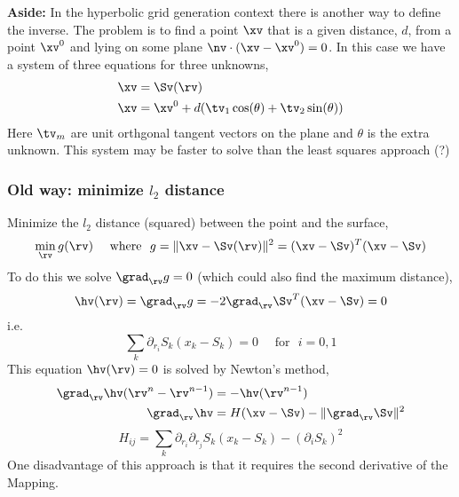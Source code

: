 {\bf Aside:} In the hyperbolic grid generation context there is another way to define
the inverse. The problem is to find a point $\xv$ that is a given distance, $d$,
from a point $\xv^0$ and lying on some plane $\nv\cdot(\xv-\xv^0)=0$. In this case
we have a system of three equations for three unknowns,
\begin{align*}
    \xv &= \Sv(\rv) \\
    \xv &= \xv^0 + d ( \tv_1 \cos(\theta) + \tv_2 \sin(\theta) )
\end{align*}
Here $\tv_m$ are unit orthgonal tangent vectors on the plane and $\theta$ is the extra unknown.
This system may be faster to solve than the least squares approach (?)

\subsubsection{Old way: minimize $l_2$ distance}

Minimize the $l_2$ distance (squared) between the point and the surface,
\[
     \min_\rv g(\rv) \mbox{~~~~where~~}
     g =  \| \xv -\Sv(\rv) \|^2 = (\xv-\Sv)^T(\xv-\Sv)
\]
To do this we solve $\grad_\rv g = 0$ (which could also find the maximum distance),
\[
    \hv(\rv) = \grad_\rv g = -2 \grad_\rv \Sv ^T (\xv-\Sv) = 0
\]
i.e.
\[
     \sum_k \partial_{r_i} S_k (x_k-S_k) = 0 \mbox{~~~~for~~} i=0,1
\]
This equation $\hv(\rv)=0$ is solved by Newton's method,
\begin{align*}
    \grad_\rv \hv (\rv^n-\rv^{n-1}) & = - \hv(\rv^{n-1}) \\
    \grad_\rv \hv &= H (\xv-\Sv) - \| \grad_\rv \Sv \|^2
\end{align*}
\[
   H_{ij} = \sum_k \partial_{r_i} \partial_{r_j} S_k (x_k-S_k) - (\partial_i S_k)^2 
\]
One disadvantage of this approach is that it requires the second derivative of
the Mapping.